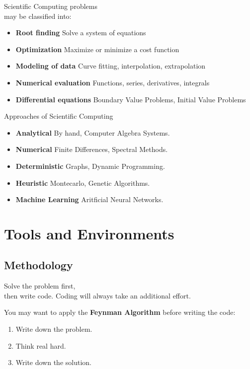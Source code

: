 \documentclass[xcolor={dvipsnames}]{beamer}
\begin{document}
\begin{frame}{Scientific Computing problems\\ may be classified into:}{}
\begin{itemize}[<+->]
\item \textbf{Root finding} Solve a system of equations
\item \textbf{Optimization} Maximize or minimize a cost function
\item \textbf{Modeling of data} Curve fitting, interpolation, extrapolation
\item \textbf{Numerical evaluation} Functions, series, derivatives, integrals
\item \textbf{Differential equations} Boundary Value Problems, Initial Value Problems
\end{itemize}
\end{frame}

\begin{frame}{Approaches of Scientific Computing}{}
\begin{itemize}[<+->]
	\item \textbf{Analytical} By hand, Computer Algebra Systems.
	\item \textbf{Numerical} Finite Differences, Spectral Methods.
	\item \textbf{Deterministic} Graphs, Dynamic Programming.
	\item \textbf{Heuristic} Montecarlo, Genetic Algorithms.
	\item \textbf{Machine Learning} Aritficial Neural Networks.
\end{itemize}
\end{frame}


\section{Tools and Environments}

\subsection{Methodology}

\begin{frame}{Solve the problem first,\\ then write code.}{}
Coding will always take an additional effort.

\pause
\bigskip
You may want to apply the \textbf{Feynman Algorithm} before writing the code:
\begin{enumerate}[<+(1)->]
\item Write down the problem.
\item Think real hard.
\item Write down the solution.
\end{enumerate}
\end{frame}
\end{document}

